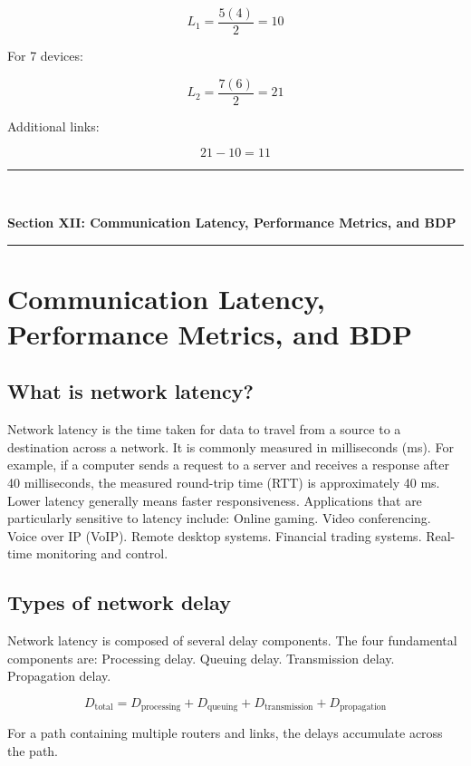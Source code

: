 \[
L_1=\frac{5(4)}{2}=10
\]

For 7 devices:

\[
L_2=\frac{7(6)}{2}=21
\]

Additional links:

\[
21-10=\boxed{11}
\]


\newpage

\newpage
\begin{center}
\vspace{0.5em}
{\color{primary}\rule{0.45\textwidth}{1.2pt}\\[4pt]}
{\Large\bfseries\color{primary} Section XII: Communication Latency, Performance Metrics, and BDP\\[2pt]}
{\color{primary}\rule{0.45\textwidth}{1.2pt}}
\vspace{0.5em}
\end{center}

\section{Communication Latency, Performance Metrics, and BDP}

\subsection{What is network latency?}
Network latency is the time taken for data to travel from a source to a destination across a network.
It is commonly measured in milliseconds (ms).
For example, if a computer sends a request to a server and receives a response after 40 milliseconds, the measured round-trip time (RTT) is approximately 40 ms.
Lower latency generally means faster responsiveness.
Applications that are particularly sensitive to latency include:
Online gaming.
Video conferencing.
Voice over IP (VoIP).
Remote desktop systems.
Financial trading systems.
Real-time monitoring and control.
\subsection{Types of network delay}
Network latency is composed of several delay components.
The four fundamental components are:
Processing delay.
Queuing delay.
Transmission delay.
Propagation delay.

\[
\boxed{D_{\text{total}}=D_{\text{processing}}+D_{\text{queuing}}+D_{\text{transmission}}+D_{\text{propagation}}}
\]

For a path containing multiple routers and links, the delays accumulate across the path.

